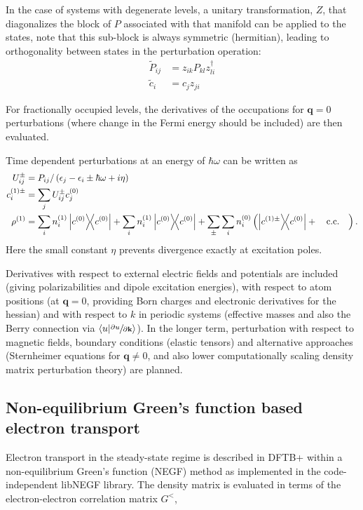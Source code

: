 \documentclass{revtex4-1}
\newcommand{\dftbp}{DFTB+}
\begin{document}
In the case of systems with degenerate levels, a unitary transformation, $Z$, that
diagonalizes the block of $P$ associated with that manifold can be applied to
the states, note that this sub-block is always symmetric (hermitian), leading to
orthogonality between states in the perturbation operation:
\begin{align}
  \tilde{P}_{ij} &= z_{ik} P_{kl} z_{li}^\dag\\
  \tilde{c}_i &= c_j z_{ji}
\end{align}

For fractionally occupied levels, the derivatives of the occupations for
$\mathbf{q}=0$ perturbations (where change in the Fermi energy should be
included) are then evaluated.\cite{nishimoto2017317}

Time dependent perturbations at an energy of $\hbar \omega$ can be written as
\begin{align}
  U_{ij}^\pm &= P_{ij} / \left( \epsilon_j - \epsilon_i \pm \hbar \omega + i\eta
               \right)\\
  c_i^{(1)\pm} &= \sum_j U_{ij}^\pm c_j^{(0)}\\
  \rho^{(1)} &= \sum_i n^{(1)}_i \dyad{c^{(0)}} + \sum_i n^{(1)}_i \dyad{c^{(0)}}
               + \sum_\pm \sum_i n^{(0)}_i \left( \dyad{c^{(1)\pm}}{c^{(0)}} + \qcc \right).
\end{align}
Here the small constant $\eta$ prevents divergence exactly at excitation
poles.

Derivatives with respect to external electric fields and potentials are included
(giving polarizabilities and dipole excitation energies), with respect to atom
positions (at $\mathbf{q}=0$, providing Born charges and electronic derivatives
for the hessian) and with respect to $k$ in periodic systems (effective masses
and also the Berry connection via $\braket{u}{\sfrac{\partial u}{\partial
    \mathbf{k}}}$). In the longer term, perturbation with respect to magnetic
fields, boundary conditions (elastic tensors) and alternative approaches
(Sternheimer equations for $\mathbf{q}\ne0$, and also lower computationally scaling
density matrix perturbation theory) are planned.

\subsection{Non-equilibrium Green's function based electron transport}

Electron transport in the steady-state regime is described in \dftbp{} within a
non-equilibrium Green's function (NEGF) method \cite{pecchia2004, haug2008} as
implemented in the code-independent libNEGF\cite{libnegf-repo} library.  The
density matrix is evaluated in terms of the electron-electron correlation matrix
$G^{<}$,\cite{haug2008}
\end{document}
